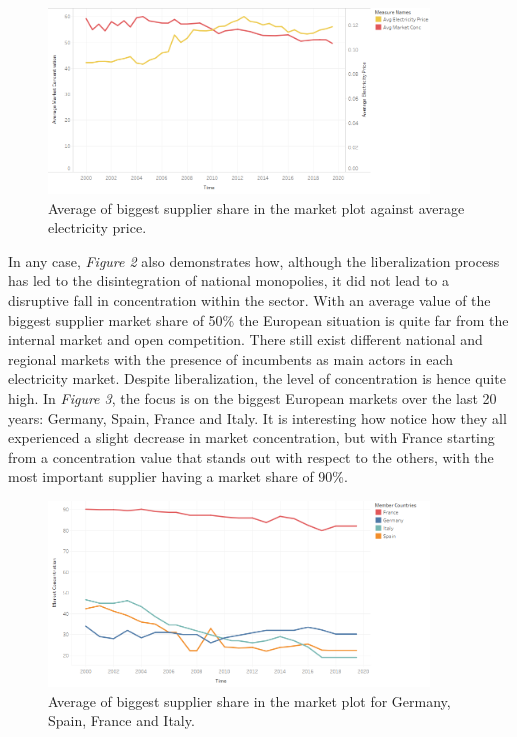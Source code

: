 \documentclass{book}
\begin{document}
\bigskip
\begin{figure}[H]
\begin{center}
\captionsetup{justification=centering}
\includegraphics[width=0.9\textwidth]{Images/conc.png}
\caption{Average of biggest supplier share in the market plot against average electricity price. }
\end{center}
\end{figure}
\bigskip

In any case, \textit{Figure 2} also demonstrates how, although the liberalization process has led to the disintegration of national monopolies, it did not lead to a disruptive fall in concentration within the sector. With an average value of the biggest  supplier market share of 50\% the European situation is quite far from the internal market and open competition. There still exist different national and regional markets with the presence of incumbents as main actors in each electricity market. Despite liberalization, the level of concentration is hence quite high.  In \textit{Figure 3}, the focus is on the biggest European markets over the last 20 years: Germany, Spain, France and Italy. It is interesting how notice how they all experienced a slight decrease in market concentration, but with France starting from a concentration value that stands out with respect to the others, with the most important supplier having a market share of 90\%.

\bigskip
\begin{figure}[H]
\begin{center}
\captionsetup{justification=centering}
\includegraphics[width=0.9\textwidth]{Images/conc-mc.png}
\caption{Average of biggest supplier share in the market plot for Germany, Spain, France and Italy. }
\end{center}
\end{figure}
\bigskip
\end{document}

